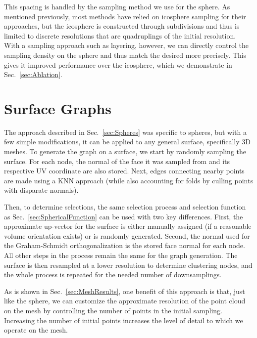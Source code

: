 \documentclass[10pt,twocolumn,letterpaper]{article}
\begin{document}
\noindent This spacing is handled by the sampling method we use for the sphere. As mentioned previously, most methods have relied on icosphere sampling for their approaches, but the icosphere is constructed through subdivisions and thus is limited to discrete resolutions that are quadruplings of the initial resolution. With a sampling approach such as layering, however, we can directly control the sampling density on the sphere and thus match the desired  more precisely. This gives it improved performance over the icosphere, which we demonstrate in Sec.~\ref{sec:Ablation}.




\section{Surface Graphs}

The approach described in Sec.~\ref{sec:Spheres} was specific to spheres, but with a few simple modifications, it can be applied to any general surface, specifically 3D meshes. To generate the graph on a surface, we start by randomly sampling the surface. For each node, the normal of the face it was sampled from and its respective UV coordinate are also stored. Next, edges connecting nearby points are made using a KNN approach (while also accounting for folds by culling points with disparate normals).

Then, to determine selections, the same selection process and selection function as Sec.~\ref{sec:SphericalFunction} can be used with two key differences. First, the approximate up-vector for the surface is either manually assigned (if a reasonable volume orientation exists) or is randomly generated. Second, the normal  used for the Graham-Schmidt orthogonalization is the stored face normal for each node. All other steps in the process remain the same for the graph generation. The surface is then resampled at a lower resolution to determine clustering nodes, and the whole process is repeated for the needed number of downsamplings.

As is shown in Sec.~\ref{sec:MeshResults}, one benefit of this approach is that, just like the sphere, we can customize the approximate resolution of the point cloud on the mesh by controlling the number of points in the initial sampling. Increasing the number of initial points increases the level of detail to which we operate on the mesh.
\end{document}
